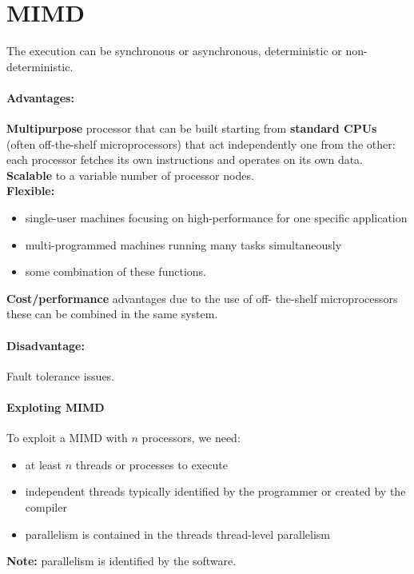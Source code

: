 
\section{MIMD}\label{sec:mimd}
The execution can be synchronous or asynchronous, deterministic or non-deterministic.

\paragraph{Advantages:} \textbf{Multipurpose} processor that can be built starting from \textbf{standard CPUs} (often
off-the-shelf
microprocessors) that act independently one from the other: each processor fetches its own instructions and operates
on its own data.
\textbf{Scalable} to a variable number of processor nodes.\\
\textbf{Flexible:}
\begin{itemize}
    \item single-user machines focusing on high-performance for one
    specific application
    \item multi-programmed machines running many tasks
    simultaneously
    \item some combination of these functions.
\end{itemize}
\textbf{Cost/performance} advantages due to the use of off-
the-shelf microprocessors these can be combined in the same system.

\paragraph{Disadvantage:} Fault tolerance issues.

\paragraph{Exploting MIMD} To exploit a MIMD with $n$ processors, we need:
\begin{itemize}
    \item at least $n$ threads or processes to execute
    \item independent threads typically identified by the programmer or
    created by the compiler
    \item parallelism is contained in the threads \textrightarrow thread-level parallelism
\end{itemize}

\textbf{Note:} parallelism is identified by the software.\\

